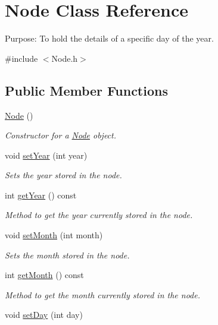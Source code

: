 \hypertarget{class_node}{}\section{Node Class Reference}
\label{class_node}


Purpose\+: To hold the details of a specific day of the year.  




{\ttfamily \#include $<$Node.\+h$>$}

\subsection*{Public Member Functions}
\begin{DoxyCompactItemize}
\item 
\hyperlink{class_node_ad7a34779cad45d997bfd6d3d8043c75f}{Node} ()
\begin{DoxyCompactList}\small\item\em Constructor for a \hyperlink{class_node}{Node} object. \end{DoxyCompactList}\item 
void \hyperlink{class_node_abd3420118a8a964e0678d1a975039e1f}{set\+Year} (int year)
\begin{DoxyCompactList}\small\item\em Sets the year stored in the node. \end{DoxyCompactList}\item 
int \hyperlink{class_node_a6d491d341577e676e56b4b0201844b4f}{get\+Year} () const
\begin{DoxyCompactList}\small\item\em Method to get the year currently stored in the node. \end{DoxyCompactList}\item 
void \hyperlink{class_node_ad8e3dddfff350a83c7f1026ffe346e62}{set\+Month} (int month)
\begin{DoxyCompactList}\small\item\em Sets the month stored in the node. \end{DoxyCompactList}\item 
int \hyperlink{class_node_a6c0cdac83e0e0fbb2cb594715a4feb5e}{get\+Month} () const
\begin{DoxyCompactList}\small\item\em Method to get the month currently stored in the node. \end{DoxyCompactList}\item 
void \hyperlink{class_node_aa6c9c8301e00180ae43100eb9c1ac458}{set\+Day} (int day)

\end{DoxyCompactItemize}
